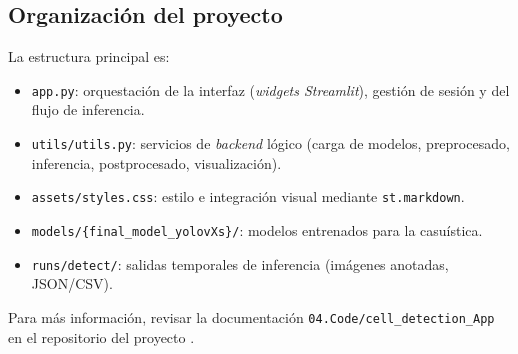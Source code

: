 \documentclass[12pt,a4paper,onecolumn,oneside]{report}
\begin{document}
\subsection{Organización del proyecto}
La estructura principal es:
\begin{itemize}
  \item \texttt{app.py}: orquestación de la interfaz (\textit{widgets Streamlit}), gestión de sesión y del flujo de inferencia.
  \item \texttt{utils/utils.py}: servicios de \textit{backend} lógico (carga de modelos, preprocesado, inferencia, postprocesado, visualización).
  \item \texttt{assets/styles.css}: estilo e integración visual mediante \texttt{st.markdown}.
  \item \texttt{models/\{final\_model\_yolovXs\}/}: modelos entrenados para la casuística.
  \item \texttt{runs/detect/}: salidas temporales de inferencia (imágenes anotadas, JSON/CSV).
\end{itemize}

Para más información, revisar la documentación \texttt{04.Code/cell\_detection\_App} en el repositorio del proyecto \cite{repoTFM}.
\end{document}
